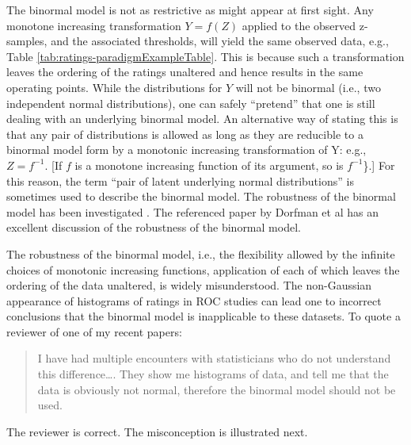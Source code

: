 \documentclass[
]{book}
\begin{document}
The binormal model is not as restrictive as might appear at first sight. Any monotone increasing transformation \(Y=f(Z)\) applied to the observed z-samples, and the associated thresholds, will yield the same observed data, e.g., Table \ref{tab:ratings-paradigmExampleTable}. This is because such a transformation leaves the ordering of the ratings unaltered and hence results in the same operating points. While the distributions for \(Y\) will not be binormal (i.e., two independent normal distributions), one can safely ``pretend'' that one is still dealing with an underlying binormal model. An alternative way of stating this is that any pair of distributions is allowed as long as they are reducible to a binormal model form by a monotonic increasing transformation of Y: e.g., \(Z=f^{-1}\). {[}If \(f\) is a monotone increasing function of its argument, so is \(f^{-1}\)\}.{]} For this reason, the term ``pair of latent underlying normal distributions'' is sometimes used to describe the binormal model. The robustness of the binormal model has been investigated \citep{hanley1988robustness, dorfman1997proper}. The referenced paper by Dorfman et al has an excellent discussion of the robustness of the binormal model.

The robustness of the binormal model, i.e., the flexibility allowed by the infinite choices of monotonic increasing functions, application of each of which leaves the ordering of the data unaltered, is widely misunderstood. The non-Gaussian appearance of histograms of ratings in ROC studies can lead one to incorrect conclusions that the binormal model is inapplicable to these datasets. To quote a reviewer of one of my recent papers:

\begin{quote}
I have had multiple encounters with statisticians who do not understand this difference\ldots. They show me histograms of data, and tell me that the data is obviously not normal, therefore the binormal model should not be used.
\end{quote}

The reviewer is correct. The misconception is illustrated next.
\end{document}
